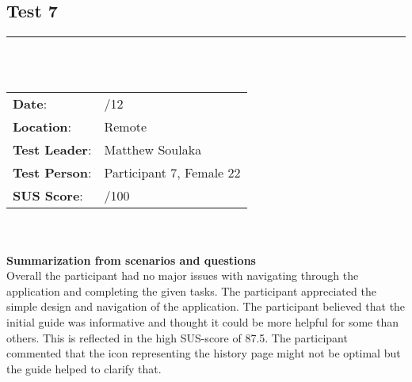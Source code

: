 \subsection{Test 7}
\noindent\rule{15.1cm}{0.4pt}\\
\\
\begin{tabularx}{0.6\textwidth}{ >{\raggedright\arraybackslash}X  >{\raggedright\arraybackslash}X  }
\textbf{Date}: & 1/12  \\
\textbf{Location}: & Remote  \\
\textbf{Test Leader}: & Matthew Soulaka  \\
\textbf{Test Person}: & Participant 7, Female 22  \\
\textbf{SUS Score}: & 87.5/100  \\

\end{tabularx}\\
\\
\textbf{Summarization from scenarios and questions} \\
\noindent Overall the participant had no major issues with navigating through the application and completing the given tasks. The participant appreciated the simple design and navigation of the application. The participant believed that the initial guide was informative and thought it could be more helpful for some than others. This is reflected in the high SUS-score of 87.5. The participant commented that the icon representing the history page might not be optimal but the guide helped to clarify that. 
 \\

